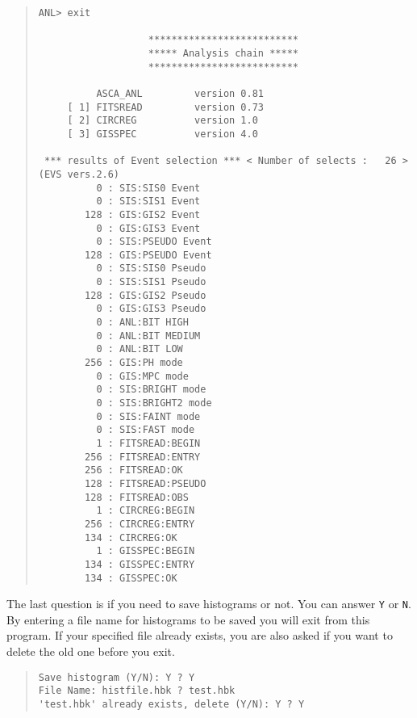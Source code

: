 \begin{quote}\baselineskip 3.2mm\begin{verbatim}
ANL> exit

                   **************************
                   ***** Analysis chain *****
                   **************************

          ASCA_ANL         version 0.81   
     [ 1] FITSREAD         version 0.73    
     [ 2] CIRCREG          version 1.0     
     [ 3] GISSPEC          version 4.0     

 *** results of Event selection *** < Number of selects :   26 > (EVS vers.2.6) 
          0 : SIS:SIS0 Event                  
          0 : SIS:SIS1 Event                  
        128 : GIS:GIS2 Event                  
          0 : GIS:GIS3 Event                  
          0 : SIS:PSEUDO Event                
        128 : GIS:PSEUDO Event                
          0 : SIS:SIS0 Pseudo                 
          0 : SIS:SIS1 Pseudo                 
        128 : GIS:GIS2 Pseudo                 
          0 : GIS:GIS3 Pseudo                 
          0 : ANL:BIT HIGH                    
          0 : ANL:BIT MEDIUM                  
          0 : ANL:BIT LOW                     
        256 : GIS:PH mode                     
          0 : GIS:MPC mode                    
          0 : SIS:BRIGHT mode                 
          0 : SIS:BRIGHT2 mode                
          0 : SIS:FAINT mode                  
          0 : SIS:FAST mode                   
          1 : FITSREAD:BEGIN                  
        256 : FITSREAD:ENTRY                  
        256 : FITSREAD:OK                     
        128 : FITSREAD:PSEUDO                 
        128 : FITSREAD:OBS                    
          1 : CIRCREG:BEGIN                   
        256 : CIRCREG:ENTRY                   
        134 : CIRCREG:OK                      
          1 : GISSPEC:BEGIN                   
        134 : GISSPEC:ENTRY                   
        134 : GISSPEC:OK                      
\end{verbatim}\end{quote}

The last question is
if you need to save histograms or not.
You can answer {\tt Y} or {\tt N}.
By entering a file name for histograms to be saved
you will exit from this program.
If your specified file already exists,
you are also asked if you want to delete the old one
before you exit.

\begin{quote}\baselineskip 3.2mm\begin{verbatim}
Save histogram (Y/N): Y ? Y
File Name: histfile.hbk ? test.hbk
'test.hbk' already exists, delete (Y/N): Y ? Y
\end{verbatim}\end{quote}


